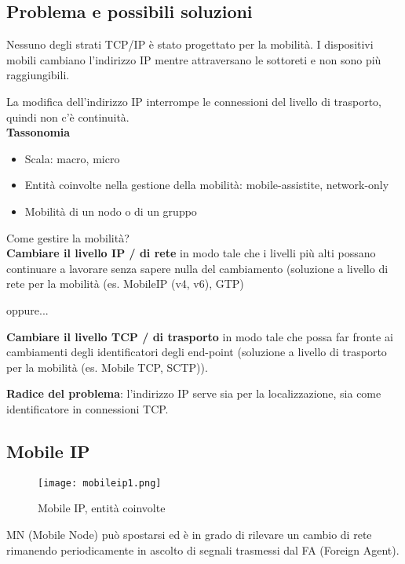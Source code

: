 \subsection{Problema e possibili soluzioni}

Nessuno degli strati TCP/IP è stato progettato per la mobilità.
I dispositivi mobili cambiano l'indirizzo IP mentre attraversano le
sottoreti e non sono più raggiungibili.

La modifica dell'indirizzo IP interrompe le connessioni del livello di
trasporto, quindi non c'è continuità. \\

\textbf{Tassonomia}

\begin{itemize}
  \item Scala: macro, micro
  \item Entità coinvolte nella gestione della mobilità: mobile-assistite,
network-only
  \item Mobilità di un nodo o di un gruppo
\end{itemize}

Come gestire la mobilità?\\

\textbf{Cambiare il livello IP / di rete} in modo tale che i livelli più alti
possano continuare a lavorare senza sapere nulla del cambiamento (soluzione
a livello di rete per la mobilità (es. MobileIP (v4, v6), GTP)

oppure...

\textbf{Cambiare il livello TCP / di trasporto} in modo tale che possa far
fronte ai cambiamenti degli identificatori degli end-point (soluzione a livello
di trasporto per la mobilità (es. Mobile TCP, SCTP)).

\textbf{Radice del problema}: l'indirizzo IP serve sia per la localizzazione,
sia come identificatore in connessioni TCP.

\subsection{Mobile IP}

\begin{figure}[H]
  \centering
  \texttt{[image: mobileip1.png]}
  \caption{Mobile IP, entità coinvolte}
  \label{fig:mobileip1}
\end{figure}

MN (Mobile Node) può spostarsi ed è in grado di rilevare un cambio di rete
rimanendo periodicamente in ascolto di segnali trasmessi dal FA (Foreign
Agent).

